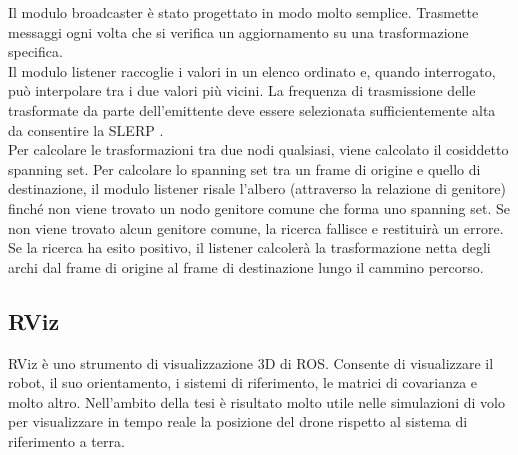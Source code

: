 Il modulo broadcaster è stato progettato in modo molto semplice. Trasmette messaggi ogni volta che si verifica un aggiornamento su una trasformazione specifica.\\

Il modulo listener raccoglie i valori in un elenco ordinato e, quando interrogato, può interpolare tra i due valori più vicini. La frequenza di trasmissione delle trasformate da parte dell'emittente deve essere selezionata sufficientemente alta da consentire la \ac{SLERP} \cite{SLERP}.\\

Per calcolare le trasformazioni tra due nodi qualsiasi, viene calcolato il cosiddetto spanning set. Per calcolare lo spanning set tra un frame di origine e quello di destinazione, il modulo listener risale l'albero (attraverso la relazione di genitore) finché non viene trovato un nodo genitore comune che forma uno spanning set. Se non viene trovato alcun genitore comune, la ricerca fallisce e restituirà un errore. Se la ricerca ha esito positivo, il listener calcolerà la trasformazione netta degli archi dal frame di origine al frame di destinazione lungo il cammino percorso.

\subsection{RViz}
\ac{RViz} è uno strumento di visualizzazione 3D di \acs{ROS}. Consente di visualizzare il robot, il suo orientamento, i sistemi di riferimento, le matrici di covarianza e molto altro. Nell'ambito della tesi è risultato molto utile nelle simulazioni di volo per visualizzare in tempo reale la posizione del drone rispetto al sistema di riferimento a terra.

